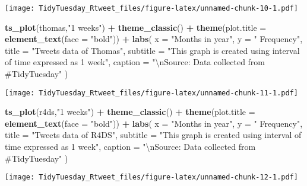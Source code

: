 \documentclass[]{article}
\newenvironment{Shaded}{\begin{snugshade}}{\end{snugshade}}
\newcommand{\CharTok}[1]{\textcolor[rgb]{0.31,0.60,0.02}{#1}}
\newcommand{\DataTypeTok}[1]{\textcolor[rgb]{0.13,0.29,0.53}{#1}}
\newcommand{\KeywordTok}[1]{\textcolor[rgb]{0.13,0.29,0.53}{\textbf{#1}}}
\newcommand{\NormalTok}[1]{#1}
\newcommand{\OperatorTok}[1]{\textcolor[rgb]{0.81,0.36,0.00}{\textbf{#1}}}
\newcommand{\StringTok}[1]{\textcolor[rgb]{0.31,0.60,0.02}{#1}}
\begin{document}
\texttt{[image: TidyTuesday\_Rtweet\_files/figure-latex/unnamed-chunk-10-1.pdf]}

\begin{Shaded}
\begin{Highlighting}[]
\KeywordTok{ts_plot}\NormalTok{(thomas,}\StringTok{"1 weeks"}\NormalTok{) }\OperatorTok{+}\StringTok{ }\KeywordTok{theme_classic}\NormalTok{() }\OperatorTok{+}\StringTok{ }\KeywordTok{theme}\NormalTok{(}\DataTypeTok{plot.title =} \KeywordTok{element_text}\NormalTok{(}\DataTypeTok{face =} \StringTok{"bold"}\NormalTok{)) }\OperatorTok{+}\StringTok{ }\KeywordTok{labs}\NormalTok{(}
    \DataTypeTok{x =} \StringTok{"Months in year"}\NormalTok{, }\DataTypeTok{y =} \StringTok{" Frequency"}\NormalTok{,}
    \DataTypeTok{title =} \StringTok{"Tweets data of Thomas"}\NormalTok{,}
    \DataTypeTok{subtitle =} \StringTok{"This graph is created using interval of time expressed as 1 week"}\NormalTok{,}
    \DataTypeTok{caption =} \StringTok{"}\CharTok{\textbackslash{}n}\StringTok{Source: Data collected from #TidyTuesday"}
\NormalTok{  ) }
\end{Highlighting}
\end{Shaded}

\texttt{[image: TidyTuesday\_Rtweet\_files/figure-latex/unnamed-chunk-11-1.pdf]}

\begin{Shaded}
\begin{Highlighting}[]
\KeywordTok{ts_plot}\NormalTok{(r4ds,}\StringTok{"1 weeks"}\NormalTok{) }\OperatorTok{+}\StringTok{ }\KeywordTok{theme_classic}\NormalTok{() }\OperatorTok{+}\StringTok{ }\KeywordTok{theme}\NormalTok{(}\DataTypeTok{plot.title =} \KeywordTok{element_text}\NormalTok{(}\DataTypeTok{face =} \StringTok{"bold"}\NormalTok{)) }\OperatorTok{+}\StringTok{ }\KeywordTok{labs}\NormalTok{(}
    \DataTypeTok{x =} \StringTok{"Months in year"}\NormalTok{, }\DataTypeTok{y =} \StringTok{" Frequency"}\NormalTok{,}
    \DataTypeTok{title =} \StringTok{"Tweets data of R4DS"}\NormalTok{,}
    \DataTypeTok{subtitle =} \StringTok{"This graph is created using interval of time expressed as 1 week"}\NormalTok{,}
    \DataTypeTok{caption =} \StringTok{"}\CharTok{\textbackslash{}n}\StringTok{Source: Data collected from #TidyTuesday"}
\NormalTok{  ) }
\end{Highlighting}
\end{Shaded}

\texttt{[image: TidyTuesday\_Rtweet\_files/figure-latex/unnamed-chunk-12-1.pdf]}
\end{document}
